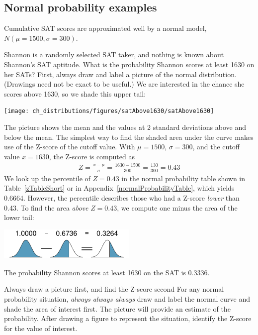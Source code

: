 \subsection{Normal probability examples}

Cumulative SAT scores are approximated well by a normal model, $N(\mu=1500, \sigma=300)$.

\begin{examplewrap}
\begin{nexample}{Shannon is a randomly selected SAT taker, and nothing is known about Shannon's SAT aptitude. What is the probability Shannon scores at least 1630 on her SATs?}\label{satAbove1630Exam}
First, always draw and label a picture of the normal distribution. (Drawings need not be exact to be useful.) We are interested in the chance she scores above 1630, so we shade this upper tail:
\begin{center}
\texttt{[image: ch\_distributions/figures/satAbove1630/satAbove1630]}
\end{center}
The picture shows the mean and the values at 2 standard deviations above and below the mean. The simplest way to find the shaded area under the curve makes use of the Z-score of the cutoff value. With $\mu=1500$, $\sigma=300$, and the cutoff value $x=1630$, the Z-score is computed as
\begin{eqnarray*}
Z = \frac{x - \mu}{\sigma} = \frac{1630 - 1500}{300} = \frac{130}{300} = 0.43
\end{eqnarray*}
We look up the percentile of $Z=0.43$ in the normal probability table shown in Table~\ref{zTableShort} or in Appendix~\vref{normalProbabilityTable}, which yields 0.6664. However, the percentile describes those who had a Z-score \emph{lower} than 0.43. To find the area \emph{above} $Z=0.43$, we compute one minus the area of the lower tail:
\begin{center}
\includegraphics[width=0.5\textwidth]{ch_distributions/figures/subtractingArea/subtractingArea}
\end{center}
The probability Shannon scores at least 1630 on the SAT is 0.3336.
\end{nexample}
\end{examplewrap}

\begin{onebox}{Always draw a picture first,
    and find the Z-score second}
  For any normal probability situation,
  \emph{always always always} draw and label the
  normal curve and shade the area of interest first.
  The picture will provide an estimate of the probability.
  After drawing a figure to represent the situation,
  identify the Z-score for the value of interest.
\end{onebox}

